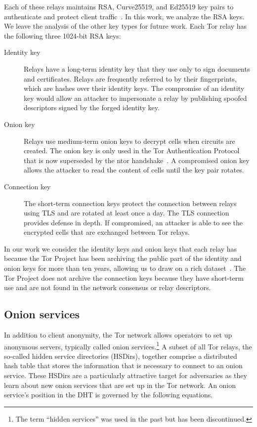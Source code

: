 Each of these relays maintains RSA, Curve25519, and Ed25519 key pairs to
authenticate and protect client traffic~\cite[\S~1.1]{torspec}. In this work, 
we analyze the RSA keys.  We leave the analysis of the other key types for
future work.  Each Tor relay has the following three 1024-bit RSA keys:

\begin{description}
	\item[Identity key] Relays have a long-term identity key that they use only
		to sign documents and certificates.  Relays are frequently referred to
		by their fingerprints, which are hashes over their identity keys.  The
		compromise of an identity key would allow an attacker to impersonate a
		relay by publishing spoofed descriptors signed by the forged identity
		key.

	\item[Onion key]  Relays use medium-term onion keys to decrypt cells when
		circuits are created.  The onion key is only used in the Tor
		Authentication Protocol that is now superseded by the ntor
		handshake~\cite{Goldberg2013a}.  A compromised onion key allows the
		attacker to read the content of cells until the key pair rotates.

	\item[Connection key] The short-term connection keys protect the connection
		between relays using TLS and are rotated at least once a day.  The TLS
		connection provides defense in depth.  If compromised, an attacker is
		able to see the encrypted cells that are exchanged between Tor relays.
\end{description}

In our work we consider the identity keys and onion keys that each relay has
because the Tor Project has been archiving the public part of the identity and
onion keys for more than ten years, allowing us to draw on a rich
dataset~\cite{collector}. The Tor Project does not archive the connection keys
because they have short-term use and are not found in the network consensus or
relay descriptors.

\subsection{Onion services}
In addition to client anonymity, the Tor network allows operators to set up
anonymous servers, typically called onion services.\footnote{The term ``hidden
services'' was used in the past but has been discontinued.} A subset of all Tor
relays, the so-called hidden service directories (HSDirs), together comprise a
distributed hash table that stores the information that is necessary to connect
to an onion service.  These HSDirs are a particularly attractive target for
adversaries as they learn about new onion services that are set up in the Tor
network.  An onion service's position in the DHT is governed by the following
equations.

